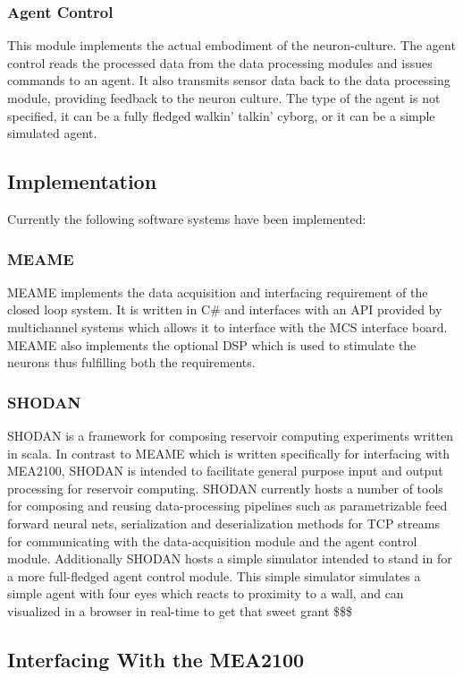 \subsubsection{Agent Control}
This module implements the actual embodiment of the neuron-culture. The agent
control reads the processed data from the data processing modules and issues
commands to an agent. It also transmits sensor data back to the data processing
module, providing feedback to the neuron culture.
The type of the agent is not specified, it can be a fully fledged walkin'
talkin' cyborg, or it can be a simple simulated agent.
\subsection{Implementation} 
Currently the following software systems have been implemented:
\subsubsection{MEAME}
MEAME implements the data acquisition and interfacing requirement of the closed
loop system. It is written in C\# and interfaces with an API provided by
multichannel systems which allows it to interface with the MCS interface board.
MEAME also implements the optional DSP which is used to stimulate the neurons
thus fulfilling both the requirements.
\subsubsection{SHODAN}
SHODAN is a framework for composing reservoir computing experiments written in
scala. In contrast to MEAME which is written specifically for interfacing with
MEA2100, SHODAN is intended to facilitate general purpose input and output
processing for reservoir computing.
SHODAN currently hosts a number of tools for composing and reusing
data-processing pipelines such as parametrizable feed forward neural nets,
serialization and deserialization methods for TCP streams for communicating with
the data-acquisition module and the agent control module.
Additionally SHODAN hosts a simple simulator intended to stand in for a more
full-fledged agent control module. This simple simulator simulates a simple
agent with four eyes which reacts to proximity to a wall, and can visualized in
a browser in real-time to get that sweet grant \$\$\$
\subsection{Interfacing With the MEA2100}

